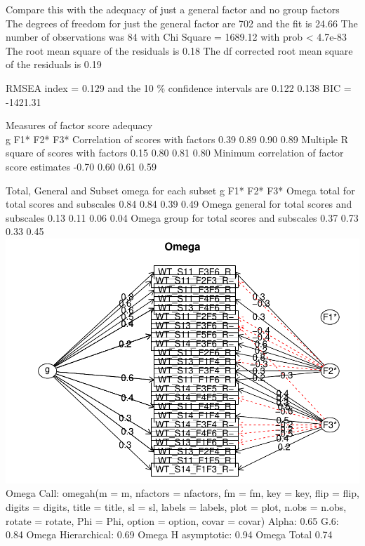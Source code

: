 \documentclass[
]{article}
\begin{document}
Compare this with the adequacy of just a general factor and no group
factors The degrees of freedom for just the general factor are 702 and
the fit is 24.66 The number of observations was 84 with Chi Square =
1689.12 with prob \textless{} 4.7e-83 The root mean square of the
residuals is 0.18 The df corrected root mean square of the residuals is
0.19

RMSEA index = 0.129 and the 10 \% confidence intervals are 0.122 0.138
BIC = -1421.31

Measures of factor score adequacy\\
g F1* F2* F3* Correlation of scores with factors 0.39 0.89 0.90 0.89
Multiple R square of scores with factors 0.15 0.80 0.81 0.80 Minimum
correlation of factor score estimates -0.70 0.60 0.61 0.59

Total, General and Subset omega for each subset g F1* F2* F3* Omega
total for total scores and subscales 0.84 0.84 0.39 0.49 Omega general
for total scores and subscales 0.13 0.11 0.06 0.04 Omega group for total
scores and subscales 0.37 0.73 0.33 0.45
\includegraphics{expertise_2024_09_26_no_outlierdetection_MK_files/figure-latex/sjt_omega-3.pdf}
Omega Call: omegah(m = m, nfactors = nfactors, fm = fm, key = key, flip
= flip, digits = digits, title = title, sl = sl, labels = labels, plot =
plot, n.obs = n.obs, rotate = rotate, Phi = Phi, option = option, covar
= covar) Alpha: 0.65 G.6: 0.84 Omega Hierarchical: 0.69 Omega H
asymptotic: 0.94 Omega Total 0.74
\end{document}
